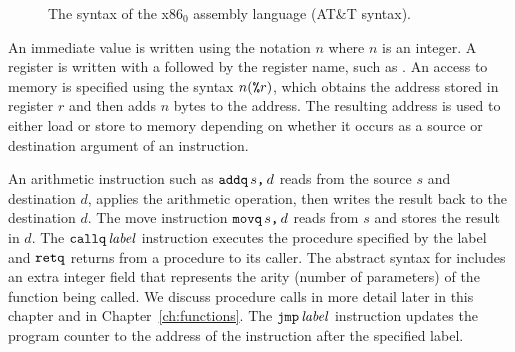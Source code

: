 \documentclass[11pt]{book}
\begin{document}
\begin{figure}[tp]
\caption{The syntax of the x86$_0$ assembly language (AT\&T syntax).}
\label{fig:x86-0-concrete}
\end{figure}

An immediate value is written using the notation \key{\$}$n$ where $n$
is an integer.
%
A register is written with a \key{\%} followed by the register name,
such as .
%
An access to memory is specified using the syntax $n(\texttt{\%}r)$,
which obtains the address stored in register $r$ and then adds $n$
bytes to the address. The resulting address is used to either load or
store to memory depending on whether it occurs as a source or
destination argument of an instruction.

An arithmetic instruction such as $\texttt{addq}\,s\texttt{,}\,d$ reads from the
source $s$ and destination $d$, applies the arithmetic operation, then
writes the result back to the destination $d$.
%
The move instruction $\texttt{movq}\,s\texttt{,}\,d$ reads from $s$ and
stores the result in $d$.
%
The $\texttt{callq}\,\mathit{label}$ instruction executes the procedure
specified by the label and $\texttt{retq}$ returns from a procedure to
its caller. The abstract syntax for  includes an extra
integer field that represents the arity (number of parameters) of the
function being called.
%
We discuss procedure calls in more detail later in this
chapter and in Chapter~\ref{ch:functions}. The
$\texttt{jmp}\,\mathit{label}$ instruction updates the program counter to
the address of the instruction after the specified label.
\end{document}
